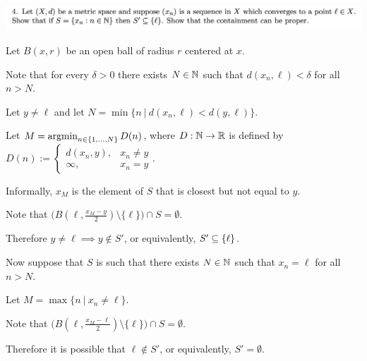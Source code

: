 \documentclass[12pt]{article}
\begin{document}
\newpage
\subsection{}
\begin{mdframed}
\includegraphics[width=400pt]{img/oxford-a2-1-4.png}
\end{mdframed}

Let $B(x, r)$ be an open ball of radius $r$ centered at $x$.

Note that for every $\delta > 0$ there exists $N \in \mathbb{N}$ such that $d(x_n, \ell) < \delta$ for all
$n > N$.

Let $y \neq \ell$ and let $N = \min\{n ~|~ d(x_n, \ell) < d(y, \ell)\}$.

Let $M = \operatorname*{argmin}_{n \in \{1, \ldots, N\}} D(n)$, where $D:\mathbb{N} \to \mathbb{R}$ is defined by
$D(n) :=
\begin{cases}
  d(x_n, y), &x_n \neq y\\
  \infty, &x_n = y
\end{cases}$.

Informally, $x_M$ is the element of $S$ that is closest but not equal to $y$.

Note that $\Big(B(\ell, \frac{x_M - y}{2})\setminus\{\ell\}\Big) \cap S = \emptyset$.

Therefore $y \neq \ell \implies y \notin S'$, or equivalently, $S' \subseteq \{\ell\}$.

Now suppose that $S$ is such that there exists $N \in \mathbb{N}$ such that $x_n = \ell$ for all $n > N$.

Let $M = \max\{n ~|~ x_n \neq \ell\}$.

Note that $\Big(B(\ell, \frac{x_M - \ell}{2})\setminus\{\ell\}\Big) \cap S = \emptyset$.

Therefore it is possible that $\ell \notin S'$, or equivalently, $S' = \emptyset$.
\end{document}
